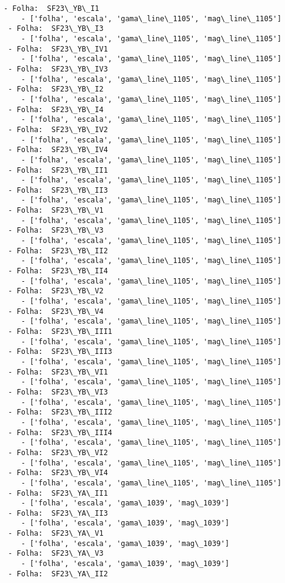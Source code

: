\documentclass[11pt]{article}
\begin{document}
    \begin{Verbatim}[commandchars=\\\{\}]
 - Folha:  SF23\_YB\_I1
    - ['folha', 'escala', 'gama\_line\_1105', 'mag\_line\_1105']
 - Folha:  SF23\_YB\_I3
    - ['folha', 'escala', 'gama\_line\_1105', 'mag\_line\_1105']
 - Folha:  SF23\_YB\_IV1
    - ['folha', 'escala', 'gama\_line\_1105', 'mag\_line\_1105']
 - Folha:  SF23\_YB\_IV3
    - ['folha', 'escala', 'gama\_line\_1105', 'mag\_line\_1105']
 - Folha:  SF23\_YB\_I2
    - ['folha', 'escala', 'gama\_line\_1105', 'mag\_line\_1105']
 - Folha:  SF23\_YB\_I4
    - ['folha', 'escala', 'gama\_line\_1105', 'mag\_line\_1105']
 - Folha:  SF23\_YB\_IV2
    - ['folha', 'escala', 'gama\_line\_1105', 'mag\_line\_1105']
 - Folha:  SF23\_YB\_IV4
    - ['folha', 'escala', 'gama\_line\_1105', 'mag\_line\_1105']
 - Folha:  SF23\_YB\_II1
    - ['folha', 'escala', 'gama\_line\_1105', 'mag\_line\_1105']
 - Folha:  SF23\_YB\_II3
    - ['folha', 'escala', 'gama\_line\_1105', 'mag\_line\_1105']
 - Folha:  SF23\_YB\_V1
    - ['folha', 'escala', 'gama\_line\_1105', 'mag\_line\_1105']
 - Folha:  SF23\_YB\_V3
    - ['folha', 'escala', 'gama\_line\_1105', 'mag\_line\_1105']
 - Folha:  SF23\_YB\_II2
    - ['folha', 'escala', 'gama\_line\_1105', 'mag\_line\_1105']
 - Folha:  SF23\_YB\_II4
    - ['folha', 'escala', 'gama\_line\_1105', 'mag\_line\_1105']
 - Folha:  SF23\_YB\_V2
    - ['folha', 'escala', 'gama\_line\_1105', 'mag\_line\_1105']
 - Folha:  SF23\_YB\_V4
    - ['folha', 'escala', 'gama\_line\_1105', 'mag\_line\_1105']
 - Folha:  SF23\_YB\_III1
    - ['folha', 'escala', 'gama\_line\_1105', 'mag\_line\_1105']
 - Folha:  SF23\_YB\_III3
    - ['folha', 'escala', 'gama\_line\_1105', 'mag\_line\_1105']
 - Folha:  SF23\_YB\_VI1
    - ['folha', 'escala', 'gama\_line\_1105', 'mag\_line\_1105']
 - Folha:  SF23\_YB\_VI3
    - ['folha', 'escala', 'gama\_line\_1105', 'mag\_line\_1105']
 - Folha:  SF23\_YB\_III2
    - ['folha', 'escala', 'gama\_line\_1105', 'mag\_line\_1105']
 - Folha:  SF23\_YB\_III4
    - ['folha', 'escala', 'gama\_line\_1105', 'mag\_line\_1105']
 - Folha:  SF23\_YB\_VI2
    - ['folha', 'escala', 'gama\_line\_1105', 'mag\_line\_1105']
 - Folha:  SF23\_YB\_VI4
    - ['folha', 'escala', 'gama\_line\_1105', 'mag\_line\_1105']
 - Folha:  SF23\_YA\_II1
    - ['folha', 'escala', 'gama\_1039', 'mag\_1039']
 - Folha:  SF23\_YA\_II3
    - ['folha', 'escala', 'gama\_1039', 'mag\_1039']
 - Folha:  SF23\_YA\_V1
    - ['folha', 'escala', 'gama\_1039', 'mag\_1039']
 - Folha:  SF23\_YA\_V3
    - ['folha', 'escala', 'gama\_1039', 'mag\_1039']
 - Folha:  SF23\_YA\_II2

\end{Verbatim}
\end{document}
